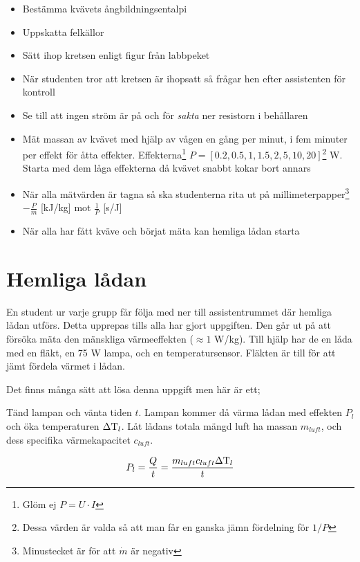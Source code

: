 \documentclass[11pt]{article}
\begin{document}
\begin{itemize}
    \item Bestämma kvävets ångbildningsentalpi
    \item Uppskatta felkällor
    \item Sätt ihop kretsen enligt figur från labbpeket
    \item När studenten tror att kretsen är ihopsatt så frågar hen efter assistenten för kontroll
    \item Se till att ingen ström är på och för \emph{sakta} ner resistorn i behållaren
    \item Mät massan av kvävet med hjälp av vågen en gång per minut, i fem minuter per effekt för åtta effekter. Effekterna\footnote{Glöm ej $P = U \cdot I$} $P = [0.2, 0.5, 1, 1.5, 2, 5, 10, 20]$\footnote{Dessa värden är valda så att man får en ganska jämn fördelning för $1/P$} W. Starta med dem låga effekterna då kvävet snabbt kokar bort annars
    \item När alla mätvärden är tagna så ska studenterna rita ut på millimeterpapper\footnote{Minustecket är för att $\dot m$ är negativ} $- \frac{P}{\dot m}$ [kJ/kg] mot $\frac{1}{P}$ [s/J]
    \item När alla har fått kväve och börjat mäta kan hemliga lådan starta
\end{itemize}

\section{Hemliga lådan}

En student ur varje grupp får följa med ner till assistentrummet där hemliga lådan utförs. Detta upprepas tills alla har gjort uppgiften. Den går ut på att försöka mäta den mänskliga värmeeffekten ($\approx 1$ W/kg). Till hjälp har de en låda med en fläkt, en 75 W lampa, och en temperatursensor. Fläkten är till för att jämt fördela värmet i lådan.

Det finns många sätt att lösa denna uppgift men här är ett;

Tänd lampan och vänta tiden $t$. Lampan kommer då värma lådan med effekten $P_l$ och öka temperaturen $\Delta \text T_l$. Låt lådans totala mängd luft ha massan $m_{luft}$, och dess specifika värmekapacitet $c_{luft}$.

\begin{equation*}
    P_l = \frac{Q}{t} = \frac{m_{luft} c_{luft} \Delta \text T_l}{t}
\end{equation*}
\end{document}

